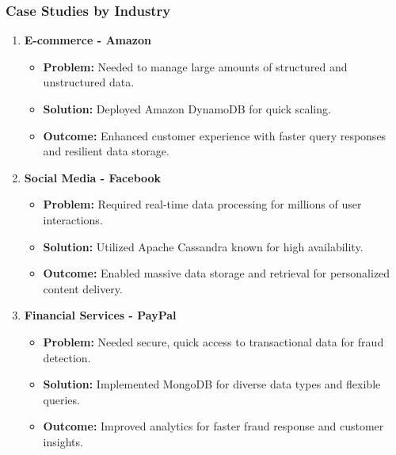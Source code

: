 \documentclass[aspectratio=169]{beamer}
\begin{document}
\begin{frame}[fragile]
    \frametitle{Case Studies by Industry}
    \begin{enumerate}
        \item \textbf{E-commerce - Amazon}
            \begin{itemize}
                \item \textbf{Problem:} Needed to manage large amounts of structured and unstructured data.
                \item \textbf{Solution:} Deployed Amazon DynamoDB for quick scaling.
                \item \textbf{Outcome:} Enhanced customer experience with faster query responses and resilient data storage.
            \end{itemize}

        \item \textbf{Social Media - Facebook}
            \begin{itemize}
                \item \textbf{Problem:} Required real-time data processing for millions of user interactions.
                \item \textbf{Solution:} Utilized Apache Cassandra known for high availability.
                \item \textbf{Outcome:} Enabled massive data storage and retrieval for personalized content delivery.
            \end{itemize}

        \item \textbf{Financial Services - PayPal}
            \begin{itemize}
                \item \textbf{Problem:} Needed secure, quick access to transactional data for fraud detection.
                \item \textbf{Solution:} Implemented MongoDB for diverse data types and flexible queries.
                \item \textbf{Outcome:} Improved analytics for faster fraud response and customer insights.
            \end{itemize}
    \end{enumerate}
\end{frame}
\end{document}
